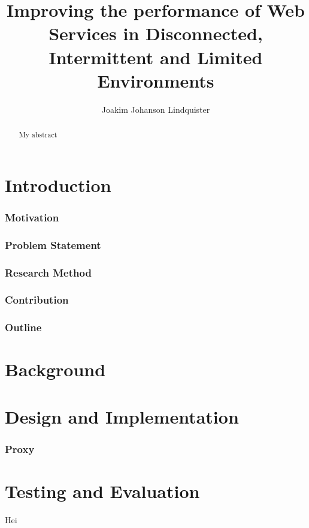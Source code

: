 \documentclass[USenglish]{article}
\title{Improving the performance of Web Services in Disconnected, Intermittent and Limited Environments}
\author{Joakim Johanson Lindquister}
\begin{document}
\ififorside{}

\begin{abstract}
    My abstract
\end{abstract}

\part{Introduction}
\section{Motivation}
\section{Problem Statement}
\section{Research Method}
\section{Contribution}
\section{Outline}

\part{Background}

\part{Design and Implementation}
\section{Proxy}

\part{Testing and Evaluation}
Hei
\end{document}
